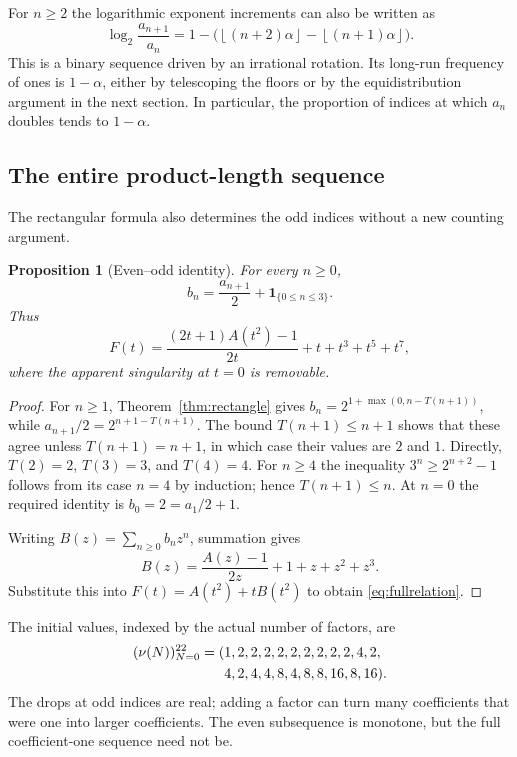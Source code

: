 \documentclass[11pt,letterpaper]{article}
\numberwithin{equation}{section}
\newtheorem{proposition}[theorem]{Proposition}
\theoremstyle{definition}
\theoremstyle{remark}
\newcommand{\ind}[1]{\boldsymbol{1}_{\{#1\}}}
\newcommand{\floor}[1]{\left\lfloor#1\right\rfloor}
\begin{document}
For $n\ge2$ the logarithmic exponent increments can also be written as
\begin{equation}\label{eq:rotationincrements}
 \log_2\frac{a_{n+1}}{a_n}
 =1-\bigl(\floor{(n+2)\alpha}-\floor{(n+1)\alpha}\bigr).
\end{equation}
This is a binary sequence driven by an irrational rotation. Its long-run
frequency of ones is $1-\alpha$, either by telescoping the floors or by
the equidistribution argument in the next section. In particular, the
proportion of indices at which $a_n$ doubles tends to $1-\alpha$.

\subsection{The entire product-length sequence}
The rectangular formula also determines the odd indices without a new
counting argument.

\begin{proposition}[Even--odd identity]\label{prop:odd}
For every $n\ge0$,
\begin{equation}\label{eq:odd}
 b_n=\frac{a_{n+1}}2+\ind{0\le n\le3}.
\end{equation}
Thus
\begin{equation}\label{eq:fullrelation}
 F(t)=\frac{(2t+1)A(t^2)-1}{2t}+t+t^3+t^5+t^7,
\end{equation}
where the apparent singularity at $t=0$ is removable.
\end{proposition}
\begin{proof}
For $n\ge1$, Theorem~\ref{thm:rectangle} gives
$b_n=2^{1+\max(0,n-T(n+1))}$, while
$a_{n+1}/2=2^{n+1-T(n+1)}$.
The bound $T(n+1)\le n+1$ shows that these agree unless
$T(n+1)=n+1$, in which case their values are $2$ and $1$.
Directly, $T(2)=2$, $T(3)=3$, and $T(4)=4$.
For $n\ge4$ the inequality $3^n\ge2^{n+2}-1$ follows from its case
$n=4$ by induction; hence $T(n+1)\le n$. At $n=0$ the required identity
is $b_0=2=a_1/2+1$.

Writing $B(z)=\sum_{n\ge0}b_nz^n$, summation gives
\[
 B(z)=\frac{A(z)-1}{2z}+1+z+z^2+z^3.
\]
Substitute this into $F(t)=A(t^2)+tB(t^2)$ to obtain
\eqref{eq:fullrelation}.
\end{proof}

The initial values, indexed by the actual number of factors, are
\begin{equation}\label{eq:fullterms}
\begin{split}
 (\nu(N))_{N=0}^{22}={}&(1,2,2,2,2,2,2,2,2,2,4,2,\\
                     &\hphantom{(}4,2,4,4,8,4,8,8,16,8,16).
\end{split}
\end{equation}
The drops at odd indices are real; adding a factor can turn many coefficients
that were one into larger coefficients. The even subsequence is monotone,
but the full coefficient-one sequence need not be.
\end{document}
